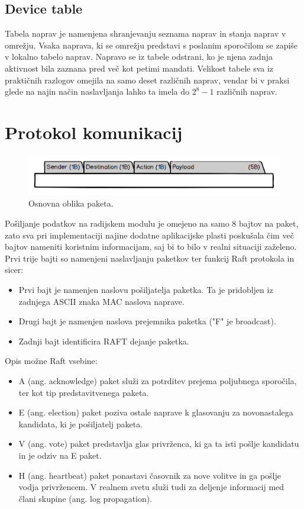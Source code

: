 \documentclass[runningheads]{llncs}
\begin{document}
\subsection{Device table}
Tabela naprav je namenjena shranjevanju seznama naprav in stanja naprav v omrežju. Vsaka naprava, ki se omrežju predstavi s poslanim sporočilom se zapiše v lokalno tabelo naprav. Napravo se iz tabele odstrani, ko je njena zadnja aktivnost bila zaznana pred več kot petimi mandati. Velikost tabele sva iz praktičnih razlogov omejila na samo deset različnih naprav, vendar bi v praksi glede na najin način naslavljanja lahko ta imela do $2^{8} - 1$ različnih naprav.

\section{Protokol komunikacij}
\begin{figure}
  \includegraphics[width=\linewidth]{packet.png}
  \caption{Osnovna oblika paketa.}
  \label{fig:paket}
\end{figure}
Pošiljanje podatkov na radijskem modulu je omejeno na samo 8 bajtov na paket, zato sva pri implementaciji najine dodatne aplikacijske plasti poskušala čim več bajtov nameniti koristnim informacijam, saj bi to bilo v realni situaciji zaželeno. Prvi trije bajti so namenjeni naslavljanju paketkov ter funkcij Raft protokola in sicer: \\
\begin{itemize}
\item Prvi bajt je namenjen naslovu pošiljatelja paketka. Ta je pridobljen iz zadnjega ASCII znaka MAC naslova naprave.
\item Drugi bajt je namenjen naslova prejemnika paketka ("F" je broadcast).
\item Zadnji bajt identificira RAFT dejanje paketka.
\end{itemize}

Opis možne Raft vsebine: 
\begin{itemize}
\item A (ang. acknowledge) paket služi za potrditev prejema poljubnega sporočila, ter kot tip predstavitvenega paketa.
\item E (ang. election) paket poziva ostale naprave k glasovanju za novonastalega kandidata, ki je pošiljatelj paketa.
\item V (ang. vote) paket predstavlja glas privrženca, ki ga ta isti pošlje kandidatu in je odziv na E paket.
\item H (ang. heartbeat) paket ponastavi časovnik za nove volitve in ga pošlje vodja privržencem. V realnem svetu služi tudi za deljenje informacij med člani skupine (ang. log propagation).
\end{itemize} 
\end{document}
